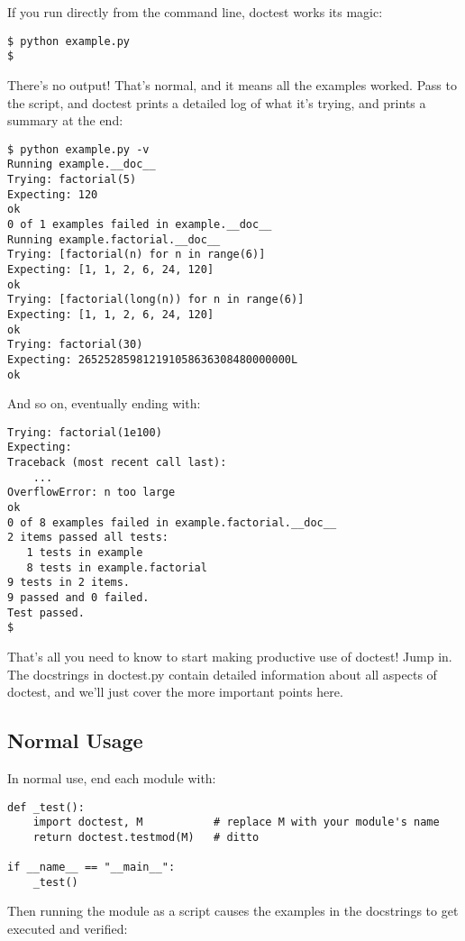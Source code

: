 If you run  directly from the command line, doctest works
its magic:

\begin{verbatim}
$ python example.py
$
\end{verbatim}

There's no output!  That's normal, and it means all the examples worked.
Pass  to the script, and doctest prints a detailed log
of what it's trying, and prints a summary at the end:

\begin{verbatim}
$ python example.py -v
Running example.__doc__
Trying: factorial(5)
Expecting: 120
ok
0 of 1 examples failed in example.__doc__
Running example.factorial.__doc__
Trying: [factorial(n) for n in range(6)]
Expecting: [1, 1, 2, 6, 24, 120]
ok
Trying: [factorial(long(n)) for n in range(6)]
Expecting: [1, 1, 2, 6, 24, 120]
ok
Trying: factorial(30)
Expecting: 265252859812191058636308480000000L
ok
\end{verbatim}

And so on, eventually ending with:

\begin{verbatim}
Trying: factorial(1e100)
Expecting:
Traceback (most recent call last):
    ...
OverflowError: n too large
ok
0 of 8 examples failed in example.factorial.__doc__
2 items passed all tests:
   1 tests in example
   8 tests in example.factorial
9 tests in 2 items.
9 passed and 0 failed.
Test passed.
$
\end{verbatim}

That's all you need to know to start making productive use of doctest!  Jump
in.  The docstrings in doctest.py contain detailed information about all
aspects of doctest, and we'll just cover the more important points here.

\subsection{Normal Usage}

In normal use, end each module  with:

\begin{verbatim}
def _test():
    import doctest, M           # replace M with your module's name
    return doctest.testmod(M)   # ditto

if __name__ == "__main__":
    _test()
\end{verbatim}

Then running the module as a script causes the examples in the docstrings
to get executed and verified:

